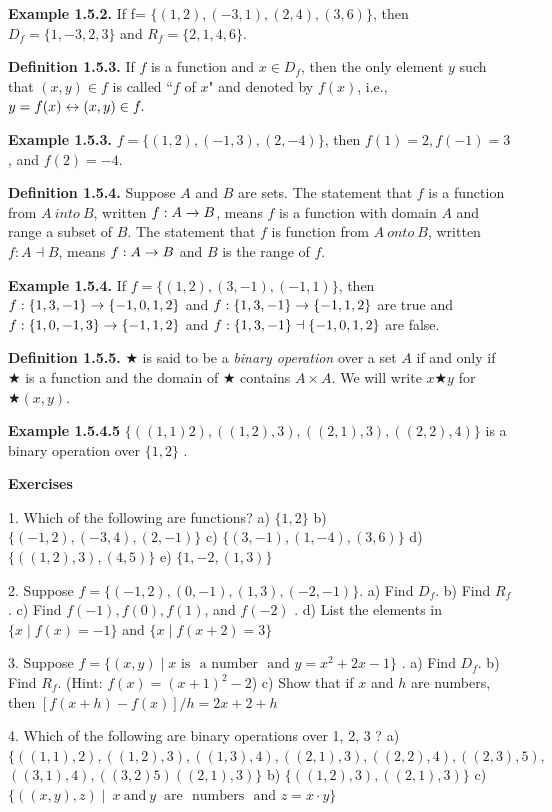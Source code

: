 \begin{large}
\textbf{Example 1.5.2.} If f= $\{(1,2), (-3,1), (2,4), (3,6)\}$, then $D_{f}= \{1, -3, 2, 3\}$ and $R_{f}= \{2, 1, 4, 6\}$.  \nl

\textbf{Definition 1.5.3.} If $f$ is a function and $x \in D_{f}$, then the only element $y$ such that $(x,y) \in f$ is called ``$f$ of $x$" and denoted by $f( x)$, i.e., $y = f(x) \leftrightarrow (x,y) \in f.$ \nl

\textbf{Example 1.5.3.} $f =\{(1,2), (-1,3), (2,-4) \}$, then $f( 1) =2, f( -1)=3$, and $f( 2)=-4$.\nl

\textbf{Definition 1.5.4.} Suppose $A$ and $B$ are sets. The statement that $f$ is a function from $A~into~B$, written $f: A \to B$, means $f$ is a function with domain $A$ and range a subset of $B$. The statement that $f$ is func­tion from $A~onto~B$, written $f:A \dashv B$, means $f:A \to B$ and $B$ is the range of $f$.\nl

\textbf{Example 1.5.4.} If $f= \{(1,2), (3,-1), (-1,1)\}$, then $f: \{1, 3, -1\} \to \{ -1, 0, 1, 2\}$ and $f: \{1, 3, -1 \} \to \{-1, 1, 2\}$  are true and $f : \{1, 0, -1, 3 \} \to \{-1, 1, 2\}$ and $f : \{1, 3, -1\} \dashv \{-1, 0,1, 2\}$ are false. \nl

\textbf{Definition 1.5.5.} $\bigstar$ is said to be a \textit{binary operation} over a set $A$ if and only if $\bigstar$ is a function and the domain of $\bigstar$ contains $A \times A$. We will write $x \bigstar y$ for $\bigstar(x,y)$. \nl

\textbf{Example 1.5.4.5} $\{((1,1)2),((1,2),3),((2,1),3),((2,2),4)\}$ is a binary operation over $\{1, 2\}$ .

\newpage

\textbf{Exercises}\nl

1. Which of the following are functions? \nl
\indent a) $\{ 1, 2 \}$\nl
\indent b) $\{(-1, 2), (-3, 4), (2, -1)\}$\nl
\indent c) $\{(3, -1),(1, -4),(3,6) \}$\nl
\indent d) $\{((1,2),3),(4,5)\}$\nl
\indent e) $\{1, -2, (1,3)   \}$\nl

2. Suppose $f= \{(-1,2), (0,-1), (1,3), (-2,-1)\}$. \nl
a) Find $D_{f}$. \nl
b) Find $R_{f}$. \nl
c) Find $f(-1), f(0), f(1)$, and $f(-2)$ . \nl
d) List the elements in $\{x \mid f(x)= -1\}$ and $\{x \mid f(x+2)=3\}$\nl

3. Suppose $f = \{(x,y) \mid x \text{~is ~a number~ and~} y=x^{2}+2x-1\}$ . \nl
a) Find $D_{f}$. \nl
b) Find $R_{f}$. (Hint: $f(x)=(x+1)^{2} -2$) \nl
c) Show that if $x$ and $h$ are numbers, then $[f(x+h)-f(x)]/h=2x + 2 + h$ \nl

4. 	Which of the following are binary operations over {1, 2, 3} ?\nl
a) $\{((1,1),2), ((1,2),3), ((1,3),4), ((2,1),3), ((2,2),4), ((2,3),5),$
$((3,1),4),((3,2) 5)((2,1),3)\}$\nl
b) $\{((1,2),3), ((2,1),3)\}$\nl
c) $\{((x,y),z) \mid ~x~ \text{and} ~y~ \text{~are ~numbers~ and~} z = x \cdot y\}$ \nl


\end{large}
